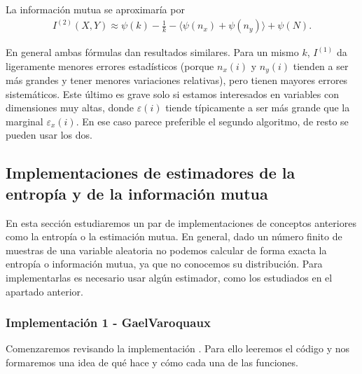 \documentclass[10pt,a4paper]{article} %
\theoremstyle{definition}
\begin{document}
La información mutua se aproximaría por
\begin{align}
I^{(2)}(X,Y) \approx \psi(k) - \frac{1}{k} - \langle \psi(n_x) + \psi(n_y) \rangle + \psi(N). \label{eq:est2}
\end{align}


En general ambas fórmulas dan resultados similares. Para un mismo $k$, $I^{(1)}$ da ligeramente menores errores estadísticos (porque $n_x(i)$ y $n_y(i)$ tienden a ser más grandes y tener menores variaciones relativas), pero tienen mayores errores sistemáticos. Este último es grave solo si estamos interesados en variables con dimensiones muy altas, donde $\varepsilon(i)$ tiende típicamente a ser más grande que la marginal $\varepsilon_x(i)$. En ese caso parece preferible el segundo algoritmo, de resto se pueden usar los dos.

\subsection{Implementaciones de estimadores de la entropía y de la información mutua}
En esta sección estudiaremos un par de implementaciones de conceptos anteriores como la entropía o la estimación mutua. En general, dado un número finito de muestras de una variable aleatoria no podemos calcular de forma exacta la entropía o información mutua, ya que no conocemos su distribución. Para implementarlas es necesario usar algún estimador, como los estudiados en el apartado anterior.

\subsubsection{Implementación 1 - GaelVaroquaux}

Comenzaremos revisando la implementación \cite{estimating}. Para ello leeremos el código y nos formaremos una idea de qué hace y cómo cada una de las funciones.
\end{document}
